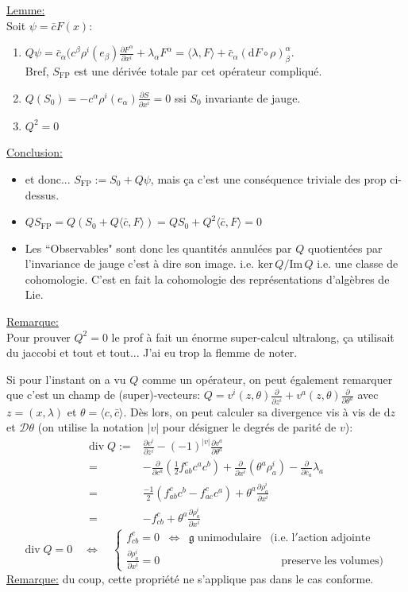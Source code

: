 \documentclass[a4paper,11pt]{article}
\renewcommand{\d}{{\mathrm{d}}}
\newcommand{\D}{{\mathcal{D}}}
\newcommand{\e}{{\mathrm{e}}}
\newcommand{\dr}[2]{\frac{\partial {#1}}{\partial{#2}}}
\begin{document}
\noindent\underline{Lemme:}\\
Soit $\psi = \bar c F(x)$:
\begin{enumerate}
\item $Q\psi = \bar c_\alpha (c^\beta \rho^i(e_\beta) \dr{F^\alpha}{x^i} + \lambda_\alpha F^\alpha = \langle\lambda,F\rangle+\bar c_\alpha (\d F\circ\rho)^\alpha_\beta$.\\
Bref, $S_\mathrm{FP}$ est une dérivée totale par cet opérateur compliqué.
\item $Q(S_0) = - c^\alpha\rho^i(e_\alpha)\dr S{x^i} = 0$ ssi $S_0$ invariante de jauge.
\item $Q^2 = 0$
\end{enumerate}
\underline{Conclusion:}
\begin{itemize}
\item et donc... $S_\mathrm{FP}:= S_0 + Q\psi$, mais ça c'est une conséquence triviale des prop ci-dessus.
\item $QS_\mathrm{FP} = Q(S_0+Q\langle\bar c, F\rangle) = QS_0 + Q^2\langle\bar c,F\rangle = 0$
\item Les ``Observables" sont donc les quantités annulées par $Q$ quotientées par l'invariance de jauge c'est à dire son image. i.e. $\mathrm{ker}\,Q/\mathrm{Im}\,Q$ i.e. une classe de cohomologie. C'est en fait la cohomologie des représentations d'algèbres de Lie.
\end{itemize}
\underline{Remarque:}\\
Pour prouver $Q^2 = 0$ le prof à fait un énorme super-calcul ultralong, ça utilisait du jaccobi et tout et tout... J'ai eu trop la flemme de noter.

Si pour l'instant on a vu $Q$ comme un opérateur, on peut également remarquer que c'est un champ de (super)-vecteurs: $Q = v^i(z,\theta)\dr{}{z^i} + v^a(z,\theta)\dr{}{\theta^a}$ avec $z=(x,\lambda)$ et $\theta = \langle c,\bar c\rangle$. Dès lors, on peut calculer sa divergence vis à vis de $\d z$ et $\D\theta$ (on utilise la notation $|v|$ pour désigner le degrés de parité de $v$):
\begin{align*}
\mathrm{div}\; Q :=& \dr{v^i}{z^i}-(-1)^{|v|}\dr{v^a}{\theta^a}\\
=& -\dr{}{c^a}\left(\frac12 f^c_{ab} c^ac^b\right)+\dr{}{x^i}(\theta^a\rho^i_a) - \dr{}{\bar c_a}\lambda_a\\
=& \frac{-1}2 \left(f^c_{ab}c^b-f^c_{ac} c^a\right)+ \theta^a\dr{\rho^i_a}{x^i}\\
=& -f^c_{cb}+\theta^a\dr{\rho^i_a}{x^i}
\end{align*}
$$\mathrm{div}\;Q = 0 \quad \iff \quad \left\{\begin{matrix} f^c_{cb}=0 & \iff & \mathfrak{g} \; \mathrm{unimodulaire} &(\mathrm{i}.\e.\; \mathrm{l}'\mathrm{action}\;\mathrm{adjointe}\\
\dr{\rho^i_a}{x^i}=0 &&&\quad \mathrm{preserve}\;\mathrm{les}\;\mathrm{volumes})
\end{matrix}\right.$$
\underline{Remarque:} du coup, cette propriété ne s'applique pas dans le cas conforme.\\
\end{document}
